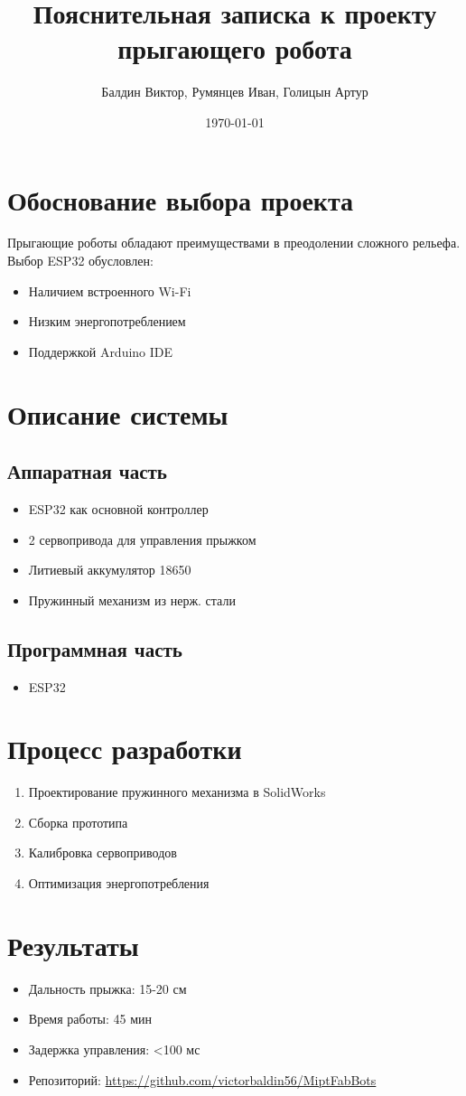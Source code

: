 \documentclass[a4paper,12pt]{article}
\title{Пояснительная записка к проекту прыгающего робота}
\author{Балдин Виктор, Румянцев Иван, Голицын Артур}
\date{\today}
\begin{document}
\maketitle

\section{Обоснование выбора проекта}
Прыгающие роботы обладают преимуществами в преодолении сложного рельефа. Выбор ESP32 обусловлен:
\begin{itemize}
\item Наличием встроенного Wi-Fi
\item Низким энергопотреблением
\item Поддержкой Arduino IDE
\end{itemize}

\section{Описание системы}
\subsection{Аппаратная часть}
\begin{itemize}
\item ESP32 как основной контроллер
\item 2 сервопривода для управления прыжком
\item Литиевый аккумулятор 18650
\item Пружинный механизм из нерж. стали
\end{itemize}

\subsection{Программная часть}
\begin{itemize}
\item ESP32
\end{itemize}

\section{Процесс разработки}
\begin{enumerate}
\item Проектирование пружинного механизма в SolidWorks
\item Сборка прототипа
\item Калибровка сервоприводов
\item Оптимизация энергопотребления
\end{enumerate}

\section{Результаты}
\begin{itemize}
\item Дальность прыжка: 15-20 см
\item Время работы: 45 мин
\item Задержка управления: <100 мс
\item Репозиторий: \url{https://github.com/victorbaldin56/MiptFabBots}
\end{itemize}
\end{document}

